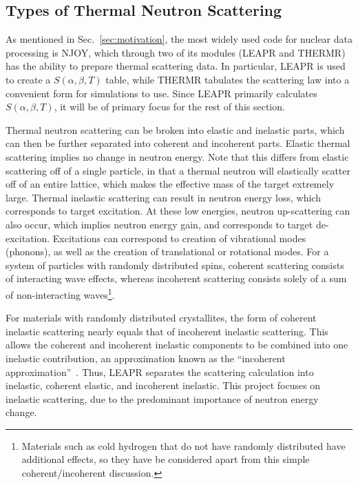 \documentclass[../master.tex]{subfiles}
\begin{document}
		\subsection{Types of Thermal Neutron Scattering}
			As mentioned in Sec.~\ref{sec:motivation}, the most widely used code for nuclear data processing is NJOY, which through two of its modules (LEAPR and THERMR) has the ability to prepare thermal scattering data. In particular, LEAPR is used to create a $S(\alpha,\beta,T)$ table, while THERMR tabulates the scattering law into a convenient form for simulations to use. Since LEAPR primarily calculates $S(\alpha,\beta,T)$, it will be of primary focus for the rest of this section.\par

			Thermal neutron scattering can be broken into elastic and inelastic parts, which can then be further separated into coherent and incoherent parts. Elastic thermal scattering implies no change in neutron energy. Note that this differs from elastic scattering off of a single particle, in that a thermal neutron will elastically scatter off of an entire lattice, which makes the effective mass of the target extremely large. Thermal inelastic scattering can result in neutron energy loss, which corresponds to target excitation. At these low energies, neutron up-scattering can also occur, which implies neutron energy gain, and corresponds to target de-excitation. Excitations can correspond to creation of vibrational modes (phonons), as well as the creation of translational or rotational modes. For a system of particles with randomly distributed spins, coherent scattering consists of interacting wave effects, whereas incoherent scattering consists solely of a sum of non-interacting waves\footnote{Materials such as cold hydrogen that do not have randomly distributed have additional effects, so they have be considered apart from this simple coherent/incoherent discussion.}.\par

			For materials with randomly distributed crystallites, the form of coherent inelastic scattering nearly equals that of incoherent inelastic scattering. This allows the coherent and incoherent inelastic components to be combined into one inelastic contribution, an approximation known as the ``incoherent approximation''~\cite{njoy,jesseholmes}. Thus, LEAPR separates the scattering calculation into inelastic, coherent elastic, and incoherent inelastic. This project focuses on inelastic scattering, due to the predominant importance of neutron energy change. 
\end{document}

